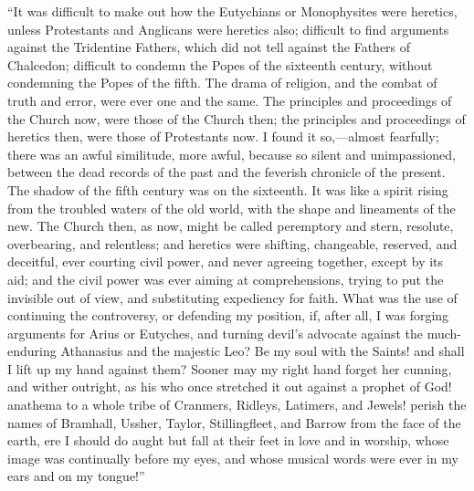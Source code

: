 ``It was difficult to make out how the Eutychians or Monophysites
were heretics, unless Protestants and Anglicans were heretics also;
difficult to find arguments against the Tridentine Fathers, which did
not tell against the Fathers of Chalcedon; difficult to condemn the
Popes of the sixteenth century, without condemning the Popes of the
fifth. The drama of religion, and the combat of truth and error, were
ever one and the same. The principles and proceedings of the Church now,
were those of the Church then; the principles and proceedings of
heretics then, were those of Protestants now. I found it so,—almost
fearfully; there was an awful similitude, more awful, because so silent
and unimpassioned, between the dead records of the past and the feverish
chronicle of the present. The shadow of the fifth century was on the
sixteenth. It was like a spirit rising from the troubled waters of the
old world, with the shape and lineaments of the new. The Church then, as
now, might be called peremptory and stern, resolute, overbearing, and
relentless; and heretics were shifting, changeable, reserved, and
deceitful, ever courting civil power, and never agreeing together,
except by its aid; and the civil power was ever aiming at
comprehensions, trying to put the invisible out of view, and
substituting expediency for faith. What was the use of continuing the
controversy, or defending my position, if, after all, I was forging
arguments for Arius or Eutyches, and turning devil's advocate
against the much-enduring Athanasius and the majestic Leo? Be my soul
with the Saints! and shall I lift up my hand against them? Sooner may my
right hand forget her cunning, and wither outright, as his who once
stretched it out against a prophet of God! anathema to a whole tribe of
Cranmers, Ridleys, Latimers, and Jewels! perish the names of Bramhall,
Ussher, Taylor, Stillingfleet, and Barrow from the face of the earth,
ere I should do aught but fall at their feet in love and in worship,
whose image was continually before my eyes, and whose musical words were
ever in my ears and on my tongue!''

